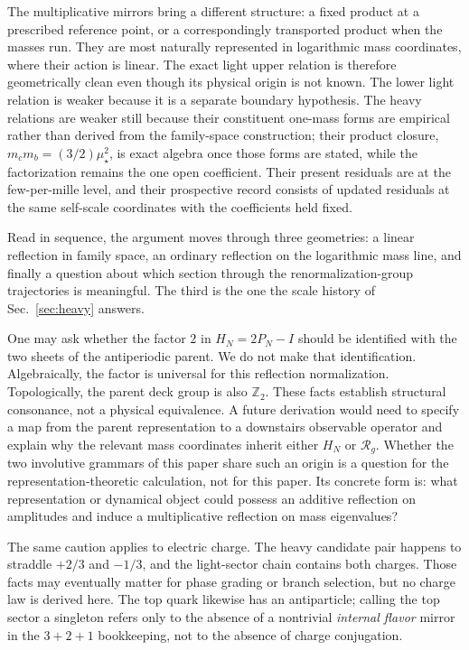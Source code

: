 \documentclass[aps,twocolumn,superscriptaddress,nofootinbib,floatfix]{revtex4-2}
\newcommand{\mstar}{\mu_\star}
\newcommand{\RR}{\mathcal R}
\begin{document}
The multiplicative mirrors bring a different structure: a fixed product at a prescribed reference point, or a correspondingly transported product when the masses run. They are most naturally represented in logarithmic mass coordinates, where their action is linear. The exact light upper relation is therefore geometrically clean even though its physical origin is not known. The lower light relation is weaker because it is a separate boundary hypothesis. The heavy relations are weaker still because their constituent one-mass forms are empirical rather than derived from the family-space construction; their product closure, $m_cm_b=(3/2)\mstar^2$, is exact algebra once those forms are stated, while the factorization remains the one open coefficient. Their present residuals are at the few-per-mille level, and their prospective record consists of updated residuals at the same self-scale coordinates with the coefficients held fixed.

Read in sequence, the argument moves through three geometries: a linear reflection in family space, an ordinary reflection on the logarithmic mass line, and finally a question about which section through the renormalization-group trajectories is meaningful. The third is the one the scale history of Sec.~\ref{sec:heavy} answers.

One may ask whether the factor $2$ in $H_N=2P_N-I$ should be identified with the two sheets of the antiperiodic parent. We do not make that identification. Algebraically, the factor is universal for this reflection normalization. Topologically, the parent deck group is also $\mathbb Z_2$. These facts establish structural consonance, not a physical equivalence. A future derivation would need to specify a map from the parent representation to a downstairs observable operator and explain why the relevant mass coordinates inherit either $H_N$ or $\RR_g$. Whether the two involutive grammars of this paper share such an origin is a question for the representation-theoretic calculation, not for this paper. Its concrete form is: what representation or dynamical object could possess an additive reflection on amplitudes and induce a multiplicative reflection on mass eigenvalues?

The same caution applies to electric charge. The heavy candidate pair happens to straddle $+2/3$ and $-1/3$, and the light-sector chain contains both charges. Those facts may eventually matter for phase grading or branch selection, but no charge law is derived here. The top quark likewise has an antiparticle; calling the top sector a singleton refers only to the absence of a nontrivial \emph{internal flavor} mirror in the $3+2+1$ bookkeeping, not to the absence of charge conjugation.
\end{document}
